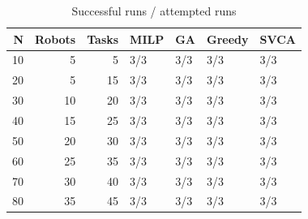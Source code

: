 \begin{table}[htbp]
\centering
\small
\caption{Successful runs / attempted runs}
\label{tab:sample_demo_outcomes}
\begin{tabular}{rrrllll}
\hline
N & Robots & Tasks & MILP & GA & Greedy & SVCA \\
\hline
10 & 5 & 5 & 3/3 & 3/3 & 3/3 & 3/3 \\
20 & 5 & 15 & 3/3 & 3/3 & 3/3 & 3/3 \\
30 & 10 & 20 & 3/3 & 3/3 & 3/3 & 3/3 \\
40 & 15 & 25 & 3/3 & 3/3 & 3/3 & 3/3 \\
50 & 20 & 30 & 3/3 & 3/3 & 3/3 & 3/3 \\
60 & 25 & 35 & 3/3 & 3/3 & 3/3 & 3/3 \\
70 & 30 & 40 & 3/3 & 3/3 & 3/3 & 3/3 \\
80 & 35 & 45 & 3/3 & 3/3 & 3/3 & 3/3 \\
\hline
\end{tabular}
\end{table}
